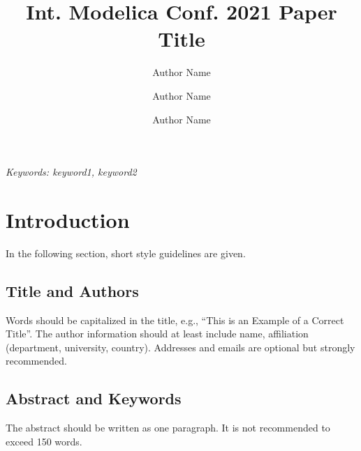 \documentclass{modelica}
\begin{document}
\thispagestyle{empty}

\title{Int. Modelica Conf. 2021 Paper Title}
\author[1]{Author Name}
\author[1]{Author Name}
\author[2]{Author Name}


\maketitle\thispagestyle{empty} %

\noindent\emph{Keywords: keyword1, keyword2}

\section{Introduction}

In the following section, short style guidelines are given.

\subsection{Title and Authors}
Words should be capitalized in the title, e.g., ``This is an Example of
a Correct Title''.  The author information should at least include
name, affiliation (department, university, country). Addresses and
emails are optional but strongly recommended.

\subsection{Abstract and Keywords}

The abstract should be written as one paragraph. It is not recommended
to exceed 150 words.
\end{document}
